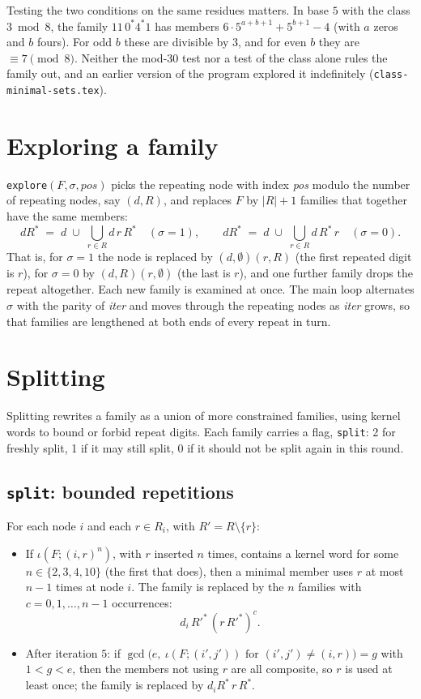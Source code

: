 \documentclass[11pt]{article}
\theoremstyle{definition}
\theoremstyle{remark}
\newcommand{\code}[1]{\texttt{#1}}
\begin{document}
Testing the two conditions on the same residues matters. In base $5$ with the class $3 \bmod 8$, the family $11\,0^*4^*1$ has members $6\cdot5^{a+b+1}+5^{b+1}-4$ (with $a$ zeros and $b$ fours). For odd $b$ these are divisible by $3$, and for even $b$ they are $\equiv 7 \pmod 8$. Neither the mod-30 test nor a test of the class alone rules the family out, and an earlier version of the program explored it indefinitely (\code{class-minimal-sets.tex}).

\section{Exploring a family}\label{sec:explore}

\code{explore}$(F,\sigma,\textit{pos})$ picks the repeating node with index \textit{pos} modulo the number of repeating nodes, say $(d,R)$, and replaces $F$ by $|R|+1$ families that together have the same members:
\[
  dR^* \;=\; d \;\cup\; \bigcup_{r\in R} d\,r\,R^* \quad(\sigma=1),
  \qquad
  dR^* \;=\; d \;\cup\; \bigcup_{r\in R} d\,R^*\,r \quad(\sigma=0).
\]
That is, for $\sigma=1$ the node is replaced by $(d,\emptyset)(r,R)$ (the first repeated digit is $r$), for $\sigma=0$ by $(d,R)(r,\emptyset)$ (the last is $r$), and one further family drops the repeat altogether. Each new family is examined at once. The main loop alternates $\sigma$ with the parity of \textit{iter} and moves through the repeating nodes as \textit{iter} grows, so that families are lengthened at both ends of every repeat in turn.

\section{Splitting}\label{sec:split}

Splitting rewrites a family as a union of more constrained families, using kernel words to bound or forbid repeat digits. Each family carries a flag, \code{split}: 2 for freshly split, 1 if it may still split, 0 if it should not be split again in this round.

\subsection{\code{split}: bounded repetitions}
For each node $i$ and each $r\in R_i$, with $R'=R\setminus\{r\}$:
\begin{itemize}
\item If $\iota(F;(i,r)^n)$, with $r$ inserted $n$ times, contains a kernel word for some $n\in\{2,3,4,10\}$ (the first that does), then a minimal member uses $r$ at most $n-1$ times at node $i$. The family is replaced by the $n$ families with $c=0,1,\dots,n-1$ occurrences:
\[
  d_i\,R'^*\,(r\,R'^*)^c .
\]
\item After iteration $5$: if $\gcd\bigl(e,\ \iota(F;(i',j'))\text{ for } (i',j')\ne(i,r)\bigr)=g$ with $1<g<e$, then the members not using $r$ are all composite, so $r$ is used at least once; the family is replaced by $d_i R^*\,r\,R^*$.
\end{itemize}
\end{document}
